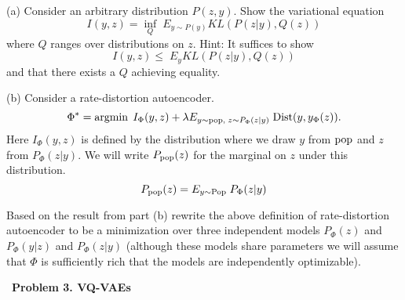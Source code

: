 \documentclass{article}
\newcommand{\solution}[1]{}
\begin{document}
(a)  Consider an arbitrary distribution $P(z,y)$. Show the variational equation
$$I(y,z) = \inf_Q\;E_{y\sim P(y)} KL(P(z|y),Q(z))$$
where $Q$ ranges over distributions on $z$.
Hint: It suffices to show $$I(y,z) \leq \;E_y KL(P(z|y),Q(z))$$
and that there exists a $Q$ achieving equality.

\solution{

  \begin{eqnarray*}
 & & I(y,z) \\
 \\
 & = & E_{y \sim \popd}\; KL(P(z|y),P(z)) \\
\\
& = & E_{y,z\sim P(z|y)}\; \left(\ln \frac{P(z|y)}{{\color{red} Q(z)}} + \ln \frac{{\color{red} Q(z)}}{P(z)}\right) \\
\\
& = & E_{y \sim P(y)}\;KL(P(z|y),Q(z)) + \left(E_{y \sim \popd,\;z\sim P(z|y)}\;\ln \frac{Q(z)}{P(z)}\right)
\\
& = & E_y\;KL(P(z|y),Q(z)) + E_{\color{red} z\sim P(z)}\;\ln \frac{Q(z)}{P(z)} \\
\\
& = & E_y\;KL(P(z|y),Q(z)) - KL(P(z),Q(z)) \\
\\
& \leq & E_{y \sim P(y)}\; KL(P(z|y),Q(z))
\end{eqnarray*}

Equality is achieved when $Q(z) = P(z)$.
}


\medskip
(b) Consider a rate-distortion autoencoder.
$$\Phi^* = \operatorname*{argmin}\;I_\Phi(y,z) + \lambda E_{y \sim \mathrm{pop},\;z \sim P_\Phi(z|y)}\;\mathrm{Dist}(y,y_\Phi(z)).$$
Here $I_\Phi(y,z)$ is defined by the distribution where we draw $y$ from $\mathrm{pop}$ and $z$ from $P_\Phi(z|y)$.
We will write $P_{\mathrm{pop}}(z)$ for the marginal on $z$ under this distribution.
$$P_{\mathrm{pop}}(z) = E_{y \sim \mathrm{Pop}} \;P_\Phi(z|y)$$

\medskip
Based on the result from part (b) rewrite the above definition of rate-distortion autoencoder to be a minimization over three independent models
$P_\Phi(z)$ and $P_\Phi(y|z)$ and $P_\Phi(z|y)$ (although these models share parameters we will assume that $\Phi$ is sufficiently rich that
the models are independently optimizable).

\solution{
  $$\Phi^* = \argmin_{\Phi} E_{y \sim \popd, z\sim P_\Phi(z|y)}\; \ln \frac{P_\Phi(z|y)}{P_\Phi(z)} + \lambda\;\mathrm{Dist}(y,y_\Phi(z)).$$
}

\bigskip
~{\bf Problem 3. VQ-VAEs}
\end{document}
